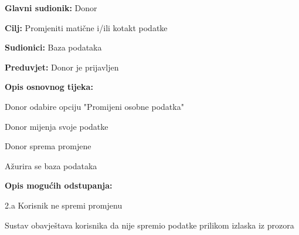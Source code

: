 \documentclass[11pt]{book}
\begin{document}
\noindent {}
					\begin{packed_item}
	
						\item \textbf{Glavni sudionik: }Donor
						\item \textbf{Cilj:} Promjeniti matične i/ili kotakt podatke
						\item \textbf{Sudionici:} Baza podataka
						\item \textbf{Preduvjet:} Donor je prijavljen
						\item \textbf{Opis osnovnog tijeka:}
						
						\item[] \begin{packed_enum}
	
							\item Donor odabire opciju "Promijeni osobne podatka"
							\item Donor mijenja svoje podatke
							\item Donor sprema promjene
							\item Ažurira se baza podataka
							
						\end{packed_enum}

						\item  \textbf{Opis mogućih odstupanja:}
						
						\item[] \begin{packed_item}
	
							\item[2.a] Korisnik ne spremi promjenu
							\item[] \begin{packed_enum}
								
								\item  Sustav obavještava korisnika da nije spremio podatke prilikom izlaska iz prozora

								
									\end{packed_enum}
								\end{packed_item}
					\end{packed_item}
\noindent {}
\end{document}
